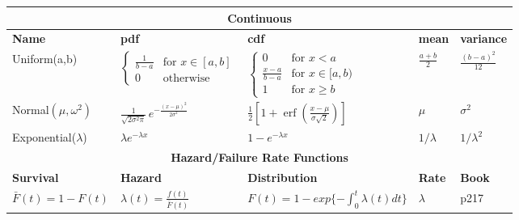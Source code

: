 \documentclass[10pt,english,landscape]{article}
\begin{document}
    \begin{tabular}{|l|l|l|l|l|}
        \hline
        \multicolumn{5}{|c|}{\textbf{Continuous}} \\ \hline
        \textbf{Name} & \textbf{pdf} & \textbf{cdf} & \textbf{mean} & \textbf{variance}\\ \hline
        Uniform(a,b) & $ \begin{cases} \frac{1}{b - a} & \text{for } x \in [a,b]  \\ 0 & \text{otherwise}\end{cases}$ & $ \begin{cases}  0  & \text{for } x < a \\ \frac{x-a}{b-a} & \text{for } x \in [a,b) \\ 1   & \text{for } x \ge b \end{cases} $&  $\frac{a+b}{2}$ & $\frac{(b-a)^2}{12}$ \\ \hline   
        Normal$(\mu,\omega^2)$ & $ \frac{1}{\sqrt{2\sigma^2\pi}}\, e^{-\frac{(x - \mu)^2}{2 \sigma^2}}$ & $ \frac12\left[1 + \operatorname{erf}\left( \frac{x-\mu}{\sigma\sqrt{2}}\right)\right] $ & $\mu$ & $ \sigma^2$ \\ \hline
        Exponential($\lambda$) & $ \lambda e^{-\lambda x} $  & $ 1 - e^{-\lambda x} $ & $1 / \lambda$ & $1 / \lambda^2$ \\ \hline
        \multicolumn{5}{|c|}{\textbf{Hazard/Failure Rate Functions}} \\ \hline
        \textbf{Survival} & \textbf{Hazard} & \textbf{Distribution} & \textbf{Rate} & \textbf{Book}\\ \hline
        $\bar{F}(t) = 1- F(t)$ & $\lambda (t) = \frac{f(t)}{\bar{F}(t)} $ & $F(t) = 1-exp \{- \int_{0}^{t} \lambda(t)dt \}$ & $\lambda$ & p217 \\ \hline
    \end{tabular}
\end{document}
